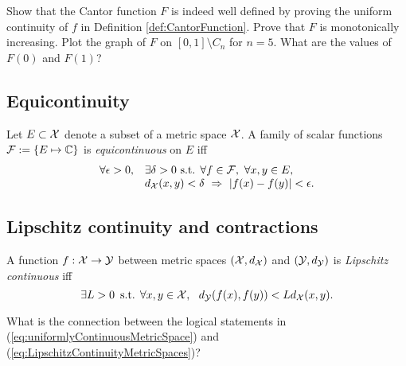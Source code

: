 \begin{exc}
  \label{exc:CantorFuncWellDefined}
  Show that the Cantor function $F$
  is indeed well defined
  by proving the uniform continuity
  of $f$ in Definition \ref{def:CantorFunction}.
  Prove that $F$ is monotonically increasing.
  Plot the graph of $F$
  on $[0,1]\setminus C_n$ for $n=5$. 
  What are the values of $F(0)$ and $F(1)$?
\end{exc}


\subsection{Equicontinuity}

\begin{defn}
  \label{def:equcontinuity}
  Let $E\subset{\cal X}$ denote a subset
  of a metric space ${\cal X}$.
  A family of scalar functions
  ${\cal F}:=\{E\mapsto \mathbb{C}\}$
  is \emph{equicontinuous} on $E$
  iff
  \begin{equation}
    \label{eq:equcontinuity}
    \begin{array}{{rl}}
    \forall \epsilon>0, &\exists \delta>0 \text{ s.t. }
    \forall f\in{\cal F},\ \forall x,y\in E,\ \\
      &d_{\cal X}(x,y)<\delta\ \Rightarrow\ |f(x)-f(y)|<\epsilon.
    \end{array}
  \end{equation}
\end{defn}


\subsection{Lipschitz continuity and contractions}
\label{sec:fixed-points}

\begin{defn}
  \label{def:LipschitzContinuityMetricSpaces}
  A function $f: {\cal X} \rightarrow {\cal Y}$ between
  metric spaces $({\cal X},d_{\cal X})$ and $({\cal Y}, d_{\cal Y})$ 
  is \emph{Lipschitz continuous} iff
  \begin{equation}
    \label{eq:LipschitzContinuityMetricSpaces}
    \exists L>0\, \text{ s.t. }
     \forall x,y \in {\cal X}, \ \ 
    d_{\cal Y}(f(x),f(y)) < L d_{\cal X}(x,y). 
  \end{equation}
\end{defn}

\begin{exc}
  What is the connection between the logical statements
  in (\ref{eq:uniformlyContinuousMetricSpace})
  and (\ref{eq:LipschitzContinuityMetricSpaces})? 
\end{exc}

